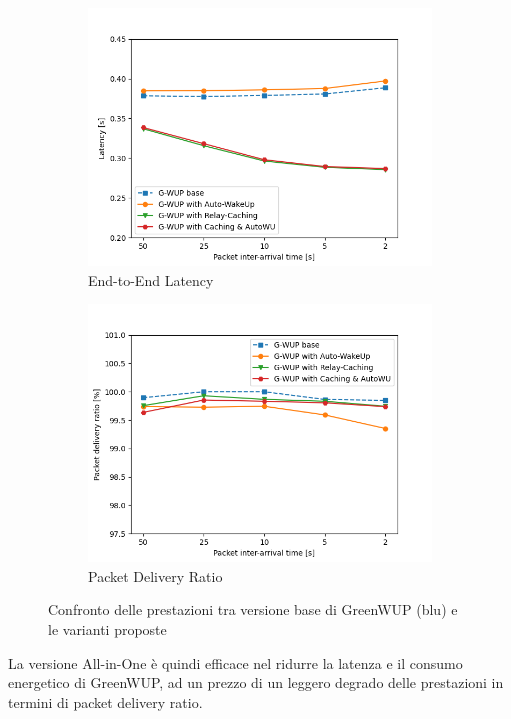 \begin{figure}[H]
\begin{subfigure}[t]{0.49\linewidth}
    \includegraphics[width=1.1\linewidth]{Contents/Images/graphs/final/latency.png}
    \caption{End-to-End Latency}
    \label{fig:Latency_final}
  \end{subfigure}
  \begin{subfigure}[t]{0.49\linewidth}
    \includegraphics[width=1.1\linewidth]{Contents/Images/graphs/final/pdr.png}
    \caption{Packet Delivery Ratio}
    \label{fig:PDR_final}
  \end{subfigure}
  \caption{Confronto delle prestazioni tra versione base di GreenWUP (blu) e le varianti proposte}
  \label{fig:final}
\end{figure}

La versione All-in-One è quindi efficace nel ridurre la latenza e il consumo energetico di GreenWUP, ad un prezzo di un leggero degrado delle prestazioni in termini di packet delivery ratio.